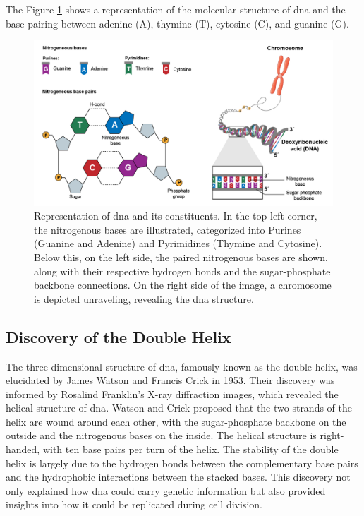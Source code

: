 The Figure \ref{fig:dna} shows a representation of the molecular structure of \ac{dna} and the base pairing between adenine (A), thymine (T), cytosine (C), and guanine (G).

\begin{figure}[H]
    \centering
    \includegraphics[width=1\textwidth]{figs/dna.png}
    \caption{Representation of \ac{dna} and its constituents. In the top left corner, the nitrogenous bases are illustrated, categorized into Purines (Guanine and Adenine) and Pyrimidines (Thymine and Cytosine). Below this, on the left side, the paired nitrogenous bases are shown, along with their respective hydrogen bonds and the sugar-phosphate backbone connections. On the right side of the image, a chromosome is depicted unraveling, revealing the \ac{dna} structure. \cite{DNA}} 
    \label{fig:dna}
\end{figure}

\subsection{Discovery of the Double Helix} \label{subsec:genetics_discovery}

The three-dimensional structure of \ac{dna}, famously known as the double helix, was elucidated by James Watson and Francis Crick in 1953. Their discovery was informed by Rosalind Franklin’s X-ray diffraction images, which revealed the helical structure of \ac{dna}. Watson and Crick proposed that the two strands of the helix are wound around each other, with the sugar-phosphate backbone on the outside and the nitrogenous bases on the inside. The helical structure is right-handed, with ten base pairs per turn of the helix. The stability of the double helix is largely due to the hydrogen bonds between the complementary base pairs and the hydrophobic interactions between the stacked bases. This discovery not only explained how \ac{dna} could carry genetic information but also provided insights into how it could be replicated during cell division. \cite{Minchin2019}

